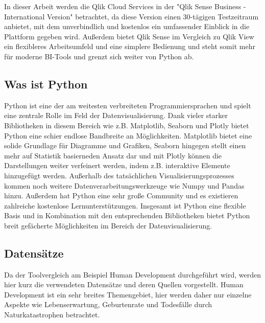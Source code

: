 \documentclass[12pt]{article}
\begin{document}
	In dieser Arbeit werden die Qlik Cloud Services in der "Qlik Sense Business - International Version"  betrachtet, da diese Version einen 30-tägigen Testzeitraum anbietet, mit dem unverbindlich und kostenlos ein umfassender Einblick in die Plattform gegeben wird. Außerdem bietet Qlik Sense im Vergleich zu Qlik View ein flexibleres Arbeitsumfeld und eine simplere Bedienung und steht somit mehr für moderne BI-Tools und grenzt sich weiter von Python ab.
	
	\subsection{Was ist Python}
	Python ist eine der am weitesten verbreiteten Programmiersprachen und spielt eine zentrale Rolle im Feld der Datenvisualisierung. Dank vieler starker Bibliotheken in diesem Bereich wie z.B. Matplotlib, Seaborn und Plotly bietet Python eine schier endlose Bandbreite an Möglichkeiten. Matplotlib bietet eine solide Grundlage für Diagramme und Grafiken, Seaborn hingegen stellt einen mehr auf Statistik basierneden Ansatz dar und mit Plotly können die Darstellungen weiter verfeinert werden, indem z.B. interaktive Elemente hinzugefügt werden. Außerhalb des tatsächlichen Visualisierungsprozesses kommen noch weitere Datenverarbeitungswerkzeuge wie Numpy und Pandas hinzu. Außerdem hat Python eine sehr große Community und es existieren zahlreiche kostenlose Lernunterstützungen.
	Insgesamt ist Python eine flexible Basis und in Kombination mit den entsprechenden Bibliotheken bietet Python breit gefächerte Möglichkeiten im Bereich der Datenvisualisierung.
	
	\subsection{Datensätze}
	Da der Toolvergleich am Beispiel Human Development durchgeführt wird, werden hier kurz die verwendeten Datensätze und deren Quellen vorgestellt.
	Human Development ist ein sehr breites Themengebiet, hier werden daher nur einzelne Aspekte wie Lebenserwartung, Geburtenrate und Todesfälle durch Naturkatastrophen betrachtet.
	
\end{document}
